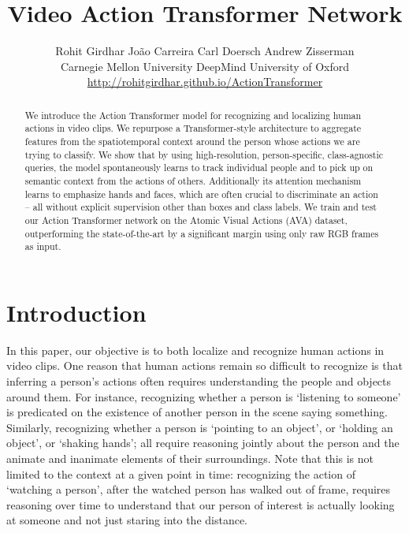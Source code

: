 \documentclass[10pt,twocolumn,letterpaper]{article}
\newcommand{\Tx}[0]{Action Transformer}
\begin{document}
\title{Video Action Transformer Network}


\author{
Rohit Girdhar \quad
Jo{\~a}o Carreira \quad
Carl Doersch \quad
Andrew Zisserman \\
Carnegie Mellon University \quad DeepMind \quad University of Oxford \\
{\small \url{http://rohitgirdhar.github.io/ActionTransformer}}
} 
\maketitle

\begin{abstract}
We introduce the \Tx{} model for 
recognizing and localizing human actions in video clips. 
We repurpose a Transformer-style architecture to aggregate features from the spatiotemporal context around the person whose actions we are trying to classify.
We show that by using  high-resolution, person-specific,  class-agnostic queries, the model spontaneously learns to track individual people and to pick up on semantic context from the actions of
others. Additionally its attention mechanism learns to emphasize hands and faces, which are often crucial to
discriminate an action -- all without explicit supervision other than boxes and class labels.
We train and test our \Tx{} network on the Atomic Visual Actions
(AVA) 
dataset, outperforming the state-of-the-art  by a significant
margin 
using 
only raw RGB frames as input.


\end{abstract} \section{Introduction}




In this paper, our objective is to both localize and recognize human actions in video clips. 
One reason that human actions remain so difficult to recognize
is that inferring a person's actions often requires understanding the
people and objects around them.  
For instance, recognizing whether a person is `listening to someone'
is predicated on the existence of another person in the scene 
saying something.  Similarly, recognizing whether a person is
`pointing to an object', or `holding an object', or `shaking hands';
all require reasoning jointly about the person and the
animate and inanimate elements of their surroundings. Note that this
is not limited to the context at a given point in time: recognizing
the action of `watching a person', after the watched person has walked out of
frame,  requires reasoning over time to understand that our
person of interest is actually looking at someone and not just staring
into the distance.
\end{document}
